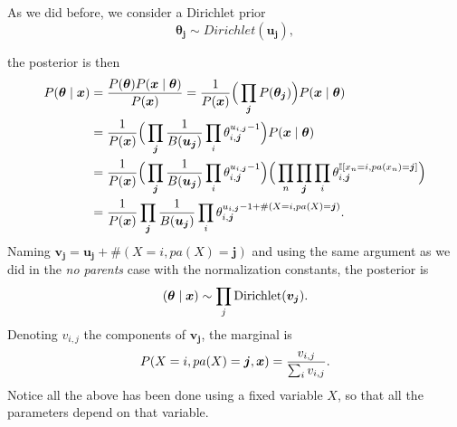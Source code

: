As we did before, we consider a Dirichlet prior
\[
  \bm{\theta_{j}} \sim Dirichlet(\bm{u_{j}}),
\]

the posterior is then
\[
  \begin{aligned}
    P(\bm{\theta} \mid \bm{x}) &= \frac{P(\bm{\theta})P(\bm{x} \mid \bm{\theta}) }{P(\bm{x})} = \frac{1}{P(\bm{x})}\Big(\prod_{\bm{j}}P(\bm{\theta_{j}}) \Big)P(\bm{x} \mid \bm{\theta}) \\
    &= \frac{1}{P(\bm{x})}\Big(\prod_{\bm{j}}\frac{1}{B(\bm{u_{j}})}\prod_{i}\theta_{i,\bm{j}}^{u_{i,\bm{j}}-1}\Big) P(\bm{x} \mid \bm{\theta})\\
    &= \frac{1}{P(\bm{x})}\Big(\prod_{\bm{j}}\frac{1}{B(\bm{u_{j}})}\prod_{i}\theta_{i,\bm{j}}^{u_{i,\bm{j}}-1}\Big) \Big(\prod_{n}\prod_{\bm{j}}\prod_{i} \theta_{i,\bm{j}}^{\mathbb{I}[x_{n} = i, pa(x_{n}) = \bm{j}]}\Big)\\
    &= \frac{1}{P(\bm{x})}\prod_{\bm{j}}\frac{1}{B(\bm{u_{j}})}\prod_{i}\theta_{i,\bm{j}}^{u_{i,\bm{j}}-1 + \#(X = i,pa(X)=\bm{j})}.
  \end{aligned}
\]
Naming \(\bm{v_{j}} = \bm{u_{j}} + \#(X = i, pa(X) = \bm{j})\) and using the same argument as we did in the \emph{no parents} case with the normalization constants, the posterior is
\[
  (\bm{\theta} \mid \bm{x}) \sim \prod_{j}\text{Dirichlet}(\bm{v_{j}}).
\]
Denoting \(v_{i,j}\) the components of \(\bm{v_{j}}\), the marginal is
\[
  P(X=i, pa(X) = \bm{j}, \bm{x}) = \frac{v_{i,j}}{\sum_{i}v_{i,j}}.
\]
Notice all the above has been done using a fixed variable \(X\), so that all the parameters depend on that variable.
